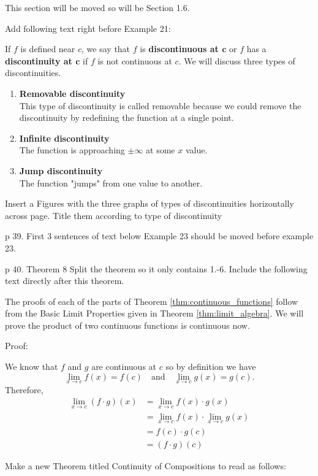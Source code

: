\documentclass[10pt]{article}
\begin{document}
 
This section will be moved so will be Section 1.6.

Add following text right before Example 21:

If $f$ is defined near $c$,  we say that $f$ is \textbf{discontinuous at $\mathbf{c}$} or $f$ has a \textbf{discontinuity at $\mathbf{c}$} if $f$ is not continuous at $c$. We will discuss three types of discontinuities. \begin{enumerate}
\item \textbf{Removable discontinuity}\\ This type of discontinuity is called removable because we could remove the discontinuity by redefining the function at a single point.
\item \textbf{Infinite discontinuity} \\ The function is approaching $\pm \infty$ at some $x$ value.
\item \textbf{Jump discontinuity}\\ The function "jumps" from one value to another.
\end{enumerate}

Insert a Figures with the three graphs of types of discontinuities horizontally across page. Title them according to type of discontinuity


p 39. First 3 sentences of text below Example 23 should be moved before example 23.  

p 40. Theorem 8 Split the theorem so it only contains 1.-6. Include the following text directly after this theorem.

The proofs of each of the parts of Theorem \ref{thm:continuous_functions} follow from the Basic Limit Properties given in Theorem \ref{thm:limit_algebra}. We will prove the product of two continuous functions is continuous now.

Proof:

We know that $f$ and $g$ are continuous at $c$ so by definition we have $$\lim_{x\to c}f(x)=f(c) \quad \text{and} \quad \lim_{x\to c} g(x)=g(c).$$  Therefore,
\begin{align*}
\lim_{x\to c} (f\cdot g)(x)&=\lim_{x\to c} f(x)\cdot g(x)\\
&=\lim_{x\to c}f(x) \cdot \lim_{x\to c} g(x)\\
&=f(c)\cdot g(c)\\
&=(f\cdot g)(c)
\end{align*}

Make a new Theorem titled Continuity of Compositions to read as follows:
\end{document}
